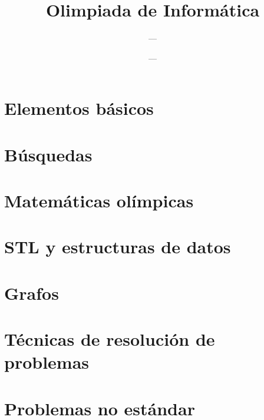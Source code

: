 \documentclass[12pt]{book}
\begin{document}
	
	
\title{Olimpiada de Informática}
\author{---}
\date{---}
\setcounter{tocdepth}{1}
\frontmatter

\maketitle
\tableofcontents

\mainmatter

\part{Elementos básicos}

\part{Búsquedas}



















\part{Matemáticas olímpicas}

\part{STL y estructuras de datos}

\part{Grafos}
















\part{Técnicas de resolución de problemas}

\part{Problemas no estándar}

\backmatter
\end{document}
